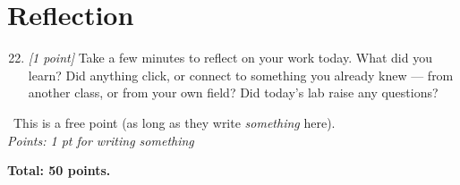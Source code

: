 \documentclass[11pt]{article}
\newcommand{\ans}[1]{%
  \par\smallskip\noindent{\color{blue!55!black}\textbf{Answer:}}\ #1\par\smallskip}
\begin{document}
\noindent

\section{Reflection}

\begin{enumerate}
    \setcounter{enumi}{21}
\item \textit{[1 point]} Take a few minutes to reflect on your work today. What did you learn? Did
anything click, or connect to something you already knew --- from another
class, or from your own field? Did today's lab raise any questions? 
\end{enumerate}
\ans{This is a free point (as long as they write \textit{something} here).
\\[2pt]
\emph{Points: 1 pt for writing something}}

\medskip
\noindent\textbf{Total: 50 points.}
\end{document}
